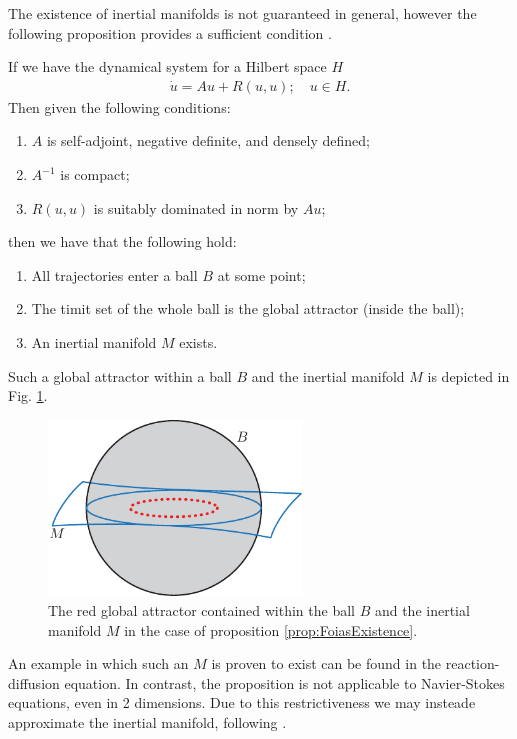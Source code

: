 The existence of inertial manifolds is not guaranteed in general, however the following proposition provides a sufficient condition \cite{FoiasInertial}.
\begin{proposition}[] \label{prop:FoiasExistence}
	If we have the dynamical system for a Hilbert space $H$
	\begin{align}
		\dot{u} = Au + R(u,u);\quad u\in H.
	\end{align}
Then given the following conditions:
\begin{enumerate}
	\item $A$ is self-adjoint, negative definite, and densely defined;
	\item $A^{-1}$ is compact;
	\item $R(u,u)$ is suitably dominated in norm by $Au$;
\end{enumerate}
then we have that the following hold:
\begin{enumerate}
	\item All trajectories enter a ball $B$ at some point;
	\item The timit set of the whole ball is the global attractor (inside the ball);
	\item An inertial manifold $M$ exists.
\end{enumerate}
Such a global attractor within a ball $B$ and the inertial manifold $M$ is depicted in Fig. \ref{fig:FoiaProp}.
\end{proposition}
\begin{figure}[h!]
	\centering
	\includegraphics[width=0.6\textwidth]{figures/ch9/28FoiaProp.pdf}
	\caption{The red global attractor contained within the ball $B$ and the inertial manifold $M$ in the case of proposition \ref{prop:FoiasExistence}.}
	\label{fig:FoiaProp}
\end{figure}

An example in which such an $M$ is proven to exist can be found in the reaction-diffusion equation. In contrast, the proposition is not applicable to Navier-Stokes equations, even in 2 dimensions. Due to this restrictiveness we may insteade approximate the inertial manifold, following \cite{FoiasApprox}.

